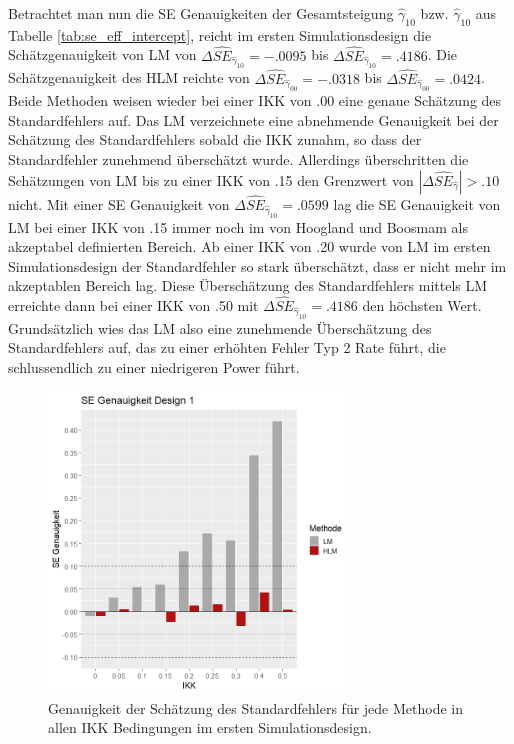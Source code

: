 \documentclass[12pt]{article}\usepackage[]{graphicx}\usepackage[]{color}
\begin{document}
Betrachtet man nun die SE Genauigkeiten der Gesamtsteigung $\widehat{\gamma}_{10}$ bzw. $\widehat{\gamma}_{10}$ aus Tabelle \ref{tab:se_eff_intercept}, reicht im ersten Simulationsdesign die Schätzgenauigkeit von LM von $\Delta\widehat{SE}_{\widehat{\gamma}_{10}} = -.0095$ bis $\Delta\widehat{SE}_{\widehat{\gamma}_{10}} = .4186$. Die Schätzgenauigkeit des HLM reichte von $\Delta\widehat{SE}_{\widehat{\gamma}_{00}} = -.0318$ bis $\Delta\widehat{SE}_{\widehat{\gamma}_{00}} = .0424$. Beide Methoden weisen wieder bei einer IKK von .00 eine genaue Schätzung des Standardfehlers auf. Das LM verzeichnete eine abnehmende Genauigkeit bei der Schätzung des Standardfehlers sobald die IKK zunahm, so dass der Standardfehler zunehmend überschätzt wurde. Allerdings überschritten die Schätzungen von LM bis zu einer IKK von .15 den Grenzwert von $|\Delta\widehat{SE}_{\widehat{\gamma}}| > .10$ nicht. Mit einer SE Genauigkeit von $\Delta\widehat{SE}_{\widehat{\gamma}_{10}} = .0599$ lag die SE Genauigkeit von LM bei einer IKK von .15 immer noch im von Hoogland und Boosmam \citeyearpar{hooglandboosma1998robustness} als akzeptabel definierten Bereich. Ab einer IKK von .20 wurde von LM im ersten Simulationsdesign der Standardfehler so stark überschätzt, dass er nicht mehr im akzeptablen Bereich lag. Diese Überschätzung des Standardfehlers mittels LM erreichte dann bei einer IKK von .50 mit $\Delta\widehat{SE}_{\widehat{\gamma}_{10}} = .4186$ den höchsten Wert. Grundsätzlich wies das LM also eine zunehmende Überschätzung des Standardfehlers auf, das zu einer erhöhten Fehler Typ 2 Rate führt, die schlussendlich zu einer niedrigeren Power führt. 
\begin{figure}[t!]
\centering
\captionsetup{width=8cm}
\includegraphics[width=8cm, height=8cm]{se_genauigkeit_design1}
\caption{Genauigkeit der Schätzung des Standardfehlers für jede Methode in allen IKK Bedingungen im ersten Simulationsdesign.}
\label{fig:se_genauigkeit_design1}
\end{figure}
\end{document}
